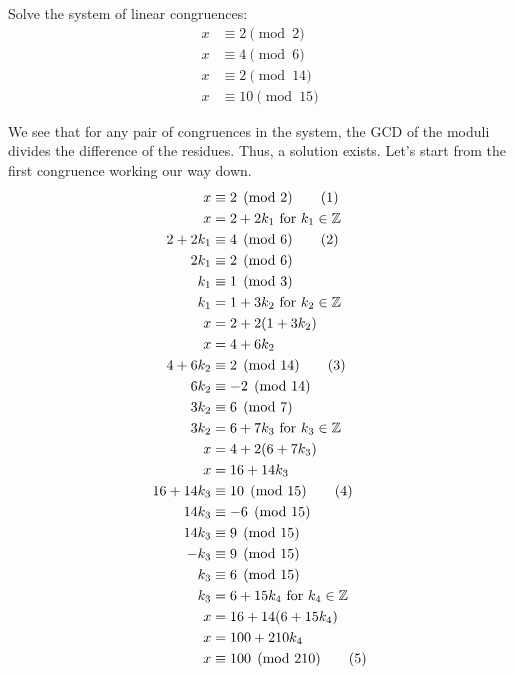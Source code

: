 \documentclass{article}
\newcommand\tagit{\addtocounter{equation}{1}\tag{\theequation}}
\begin{document}
\begin{problem}{}{}
    Solve the system of linear congruences:
    \begin{align*}
        x &\equiv 2 \pmod{2} \\
        x &\equiv 4 \pmod{6} \\
        x &\equiv 2 \pmod{14} \\
        x &\equiv 10 \pmod{15}
    \end{align*}
\end{problem}
\begin{solution}{}{}
    We see that for any pair of congruences in the system, the GCD of the moduli divides the difference of the residues. Thus, a solution exists. Let's start from the first congruence working our way down.
    \begin{align*}
    x&\equiv 2\pmod{2} \tagit \\
    x&=2+2k_1 \text{ for } k_1\in\mathbb{Z} \\
    2+2k_1 &\equiv 4 \pmod{6} \tagit \\
    2k_1 &\equiv 2 \pmod{6} \\
    k_1 &\equiv 1 \pmod{3}\\
    k_1 &= 1+3k_2 \text{ for } k_2\in\mathbb{Z}\\
    x&=2+2(1+3k_2) \\
    x &= 4+6k_2 \\
    4+6k_2 &\equiv 2 \pmod{14} \tagit \\
    6k_2 &\equiv -2 \pmod{14} \\
    3k_2 &\equiv 6 \pmod{7} \\
    3k_2 &= 6+7k_3 \text{ for } k_3\in\mathbb{Z}\\
    x&=4+2(6+7k_3) \\
    x &= 16+14k_3 \\
    16+14k_3 &\equiv 10 \pmod{15} \tagit \\
    14k_3 &\equiv -6 \pmod{15} \\
    14k_3 &\equiv 9 \pmod{15} \\
    -k_3 &\equiv 9 \pmod{15} \\
    k_3 &\equiv 6 \pmod{15} \\
    k_3 &= 6+15k_4 \text{ for } k_4\in\mathbb{Z}\\
    x&=16+14(6+15k_4) \\
    x &= 100+210k_4 \\
    x &\equiv 100 \pmod{210} \tagit
    \end{align*}
\end{solution}
\end{document}
